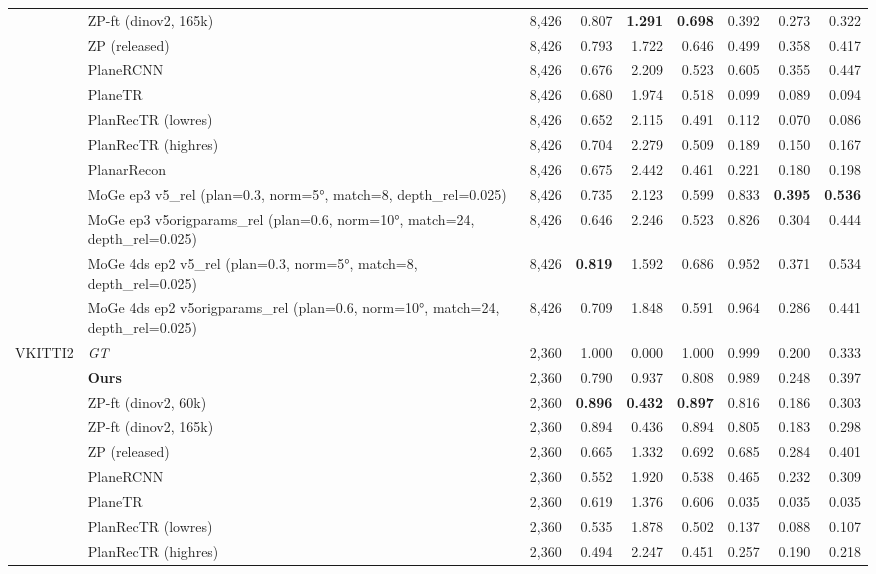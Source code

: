 \begin{table}[t]
\begin{tabular}{l l r r r r r r r}
 & ZP-ft (dinov2, 165k) & 8,426 & 0.807 & \textbf{1.291} & \textbf{0.698} & 0.392 & 0.273 & 0.322 \\
 & ZP (released) & 8,426 & 0.793 & 1.722 & 0.646 & 0.499 & 0.358 & 0.417 \\
 & PlaneRCNN & 8,426 & 0.676 & 2.209 & 0.523 & 0.605 & 0.355 & 0.447 \\
 & PlaneTR & 8,426 & 0.680 & 1.974 & 0.518 & 0.099 & 0.089 & 0.094 \\
 & PlanRecTR (lowres) & 8,426 & 0.652 & 2.115 & 0.491 & 0.112 & 0.070 & 0.086 \\
 & PlanRecTR (highres) & 8,426 & 0.704 & 2.279 & 0.509 & 0.189 & 0.150 & 0.167 \\
 & PlanarRecon & 8,426 & 0.675 & 2.442 & 0.461 & 0.221 & 0.180 & 0.198 \\
 & MoGe ep3 v5\_rel (plan=0.3, norm=5°, match=8, depth\_rel=0.025) & 8,426 & 0.735 & 2.123 & 0.599 & 0.833 & \textbf{0.395} & \textbf{0.536} \\
 & MoGe ep3 v5origparams\_rel (plan=0.6, norm=10°, match=24, depth\_rel=0.025) & 8,426 & 0.646 & 2.246 & 0.523 & 0.826 & 0.304 & 0.444 \\
 & MoGe 4ds ep2 v5\_rel (plan=0.3, norm=5°, match=8, depth\_rel=0.025) & 8,426 & \textbf{0.819} & 1.592 & 0.686 & 0.952 & 0.371 & 0.534 \\
 & MoGe 4ds ep2 v5origparams\_rel (plan=0.6, norm=10°, match=24, depth\_rel=0.025) & 8,426 & 0.709 & 1.848 & 0.591 & 0.964 & 0.286 & 0.441 \\
\midrule
VKITTI2 & \textit{GT} & 2,360 & 1.000 & 0.000 & 1.000 & 0.999 & 0.200 & 0.333 \\
 & \textbf{Ours} & 2,360 & 0.790 & 0.937 & 0.808 & 0.989 & 0.248 & 0.397 \\
 & ZP-ft (dinov2, 60k) & 2,360 & \textbf{0.896} & \textbf{0.432} & \textbf{0.897} & 0.816 & 0.186 & 0.303 \\
 & ZP-ft (dinov2, 165k) & 2,360 & 0.894 & 0.436 & 0.894 & 0.805 & 0.183 & 0.298 \\
 & ZP (released) & 2,360 & 0.665 & 1.332 & 0.692 & 0.685 & 0.284 & 0.401 \\
 & PlaneRCNN & 2,360 & 0.552 & 1.920 & 0.538 & 0.465 & 0.232 & 0.309 \\
 & PlaneTR & 2,360 & 0.619 & 1.376 & 0.606 & 0.035 & 0.035 & 0.035 \\
 & PlanRecTR (lowres) & 2,360 & 0.535 & 1.878 & 0.502 & 0.137 & 0.088 & 0.107 \\
 & PlanRecTR (highres) & 2,360 & 0.494 & 2.247 & 0.451 & 0.257 & 0.190 & 0.218 \\

\end{tabular}
\end{table}
